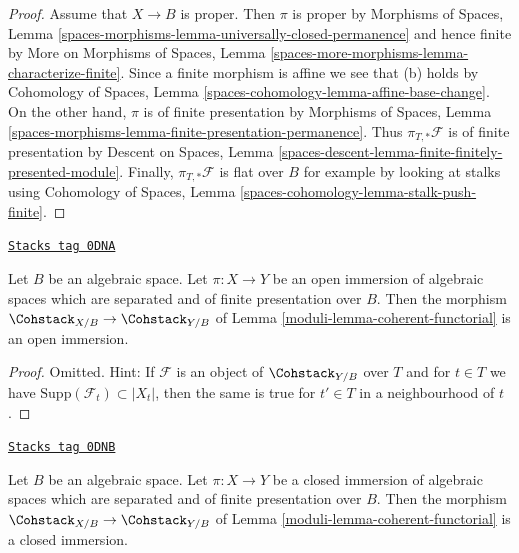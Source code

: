 \begin{proof}
\medskip\noindent
Assume that $X \to B$ is proper. Then $\pi$ is proper
by Morphisms of Spaces, Lemma
\ref{spaces-morphisms-lemma-universally-closed-permanence}
and hence finite by
More on Morphisms of Spaces,
Lemma \ref{spaces-more-morphisms-lemma-characterize-finite}.
Since a finite morphism is affine we see that (b) holds by
Cohomology of Spaces, Lemma \ref{spaces-cohomology-lemma-affine-base-change}.
On the other hand, $\pi$ is of finite presentation by
Morphisms of Spaces, Lemma
\ref{spaces-morphisms-lemma-finite-presentation-permanence}.
Thus $\pi_{T, *}\mathcal{F}$ is of finite presentation by
Descent on Spaces, Lemma
\ref{spaces-descent-lemma-finite-finitely-presented-module}.
Finally, $\pi_{T, *}\mathcal{F} $ is flat over $B$ for example
by looking at stalks using
Cohomology of Spaces, Lemma \ref{spaces-cohomology-lemma-stalk-push-finite}.
\end{proof}

\begin{lemma}
\label{moduli-lemma-coherent-open}
\href{https://stacks.math.columbia.edu/tag/0DNA}{\texttt{Stacks tag 0DNA}}

Let $B$ be an algebraic space. Let $\pi : X \to Y$ be an open immersion
of algebraic spaces which are separated and of finite presentation over $B$.
Then the morphism $\Cohstack_{X/B} \to \Cohstack_{Y/B}$ of
Lemma \ref{moduli-lemma-coherent-functorial} is an open immersion.
\end{lemma}

\begin{proof}
Omitted. Hint: If $\mathcal{F}$ is an object of $\Cohstack_{Y/B}$ over $T$
and for $t \in T$ we have $\text{Supp}(\mathcal{F}_t) \subset |X_t|$,
then the same is true for $t' \in T$ in a neighbourhood of $t$.
\end{proof}

\begin{lemma}
\label{moduli-lemma-coherent-closed}
\href{https://stacks.math.columbia.edu/tag/0DNB}{\texttt{Stacks tag 0DNB}}

Let $B$ be an algebraic space. Let $\pi : X \to Y$ be a closed immersion
of algebraic spaces which are separated and of finite presentation over $B$.
Then the morphism $\Cohstack_{X/B} \to \Cohstack_{Y/B}$ of
Lemma \ref{moduli-lemma-coherent-functorial} is a closed immersion.
\end{lemma}

